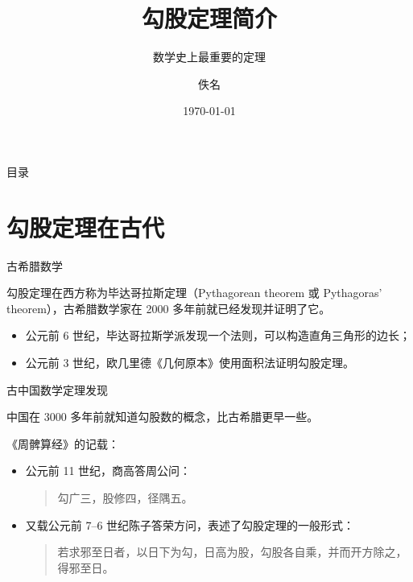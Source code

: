 \documentclass[aspectratio=169]{ctexbeamer}
\title{勾股定理简介}
\subtitle{数学史上最重要的定理}
\institute{初中数学研讨班}
\author{佚名}
\date{\today}
\begin{document}
\maketitle

\begin{frame}{目录}
\tableofcontents[pausesections]   %
\end{frame}

\section{勾股定理在古代}
\label{sec:ancient}

\begin{frame}{古希腊数学}

勾股定理在西方称为毕达哥拉斯定理（Pythagorean theorem 或 Pythagoras' theorem），古希腊数学家在 2000 多年前就已经发现并证明了它\cite{Kline}。\pause
\begin{itemize}
  \item<+-| alert@+>
    公元前 6 世纪，毕达哥拉斯学派发现一个法则，可以构造直角三角形的边长；
  \item<+-| alert@+>
    公元前 3 世纪，欧几里德《几何原本》使用面积法证明勾股定理。
\end{itemize}
\end{frame}

\begin{frame}{古中国数学}{定理发现}

中国在 3000 多年前就知道勾股数的概念，比古希腊更早一些。\pause

《周髀算经》的记载：\pause
\begin{itemize}[<+-| alert@+>]
  \item 公元前 11 世纪，商高答周公问：
  \begin{quote}
  勾广三，股修四，径隅五。
  \end{quote}
  \item 又载公元前 7--6 世纪陈子答荣方问，表述了勾股定理的一般形式：
  \begin{quote}
  若求邪至日者，以日下为勾，日高为股，勾股各自乘，并而开方除之，得邪至日。
  \end{quote}
\end{itemize}
\end{frame}
\end{document}
